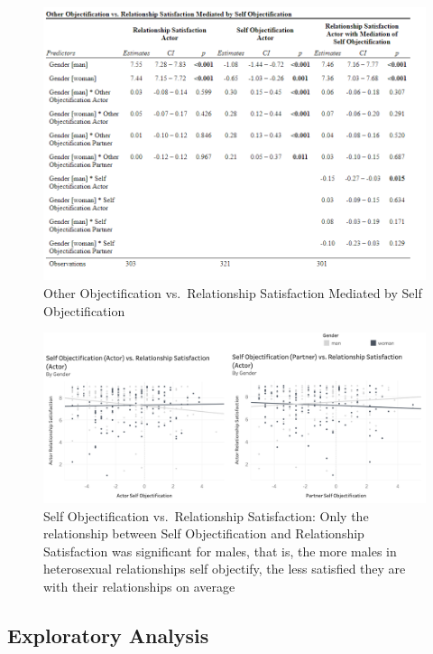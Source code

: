 \documentclass[
  english,
  man,floatsintext]{apa6}
\begin{document}
\begin{figure}
\centering
\includegraphics{Images/ResultsTable.png}
\caption{Other Objectification vs.~Relationship Satisfaction Mediated by Self Objectification}
\end{figure}

\begin{figure}
\centering
\includegraphics{Images/SO_vs_RSA.png}
\caption{Self Objectification vs.~Relationship Satisfaction: Only the relationship between Self Objectification and Relationship Satisfaction was significant for males, that is, the more males in heterosexual relationships self objectify, the less satisfied they are with their relationships on average}
\end{figure}

\hypertarget{exploratory-analysis}{%
\subsection{Exploratory Analysis}\label{exploratory-analysis}}
\end{document}
